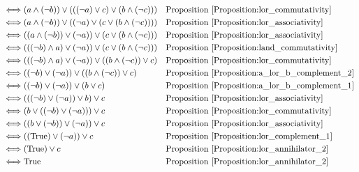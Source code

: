 \begin{prop}
\begin{align*}
\iff & (a \land (\lnot b)) \lor (((\lnot a) \lor c) \lor (b \land (\lnot c)))
& & \text{Proposition \ref{Proposition:lor_commutativity}} \\
\iff & (a \land (\lnot b)) \lor ((\lnot a) \lor (c \lor (b \land (\lnot c))))
& & \text{Proposition \ref{Proposition:lor_associativity}} \\
\iff & ((a \land (\lnot b)) \lor (\lnot a)) \lor (c \lor (b \land (\lnot c)))
& & \text{Proposition \ref{Proposition:lor_associativity}} \\
\iff & (((\lnot b) \land a) \lor (\lnot a)) \lor (c \lor (b \land (\lnot c)))
& & \text{Proposition \ref{Proposition:land_commutativity}} \\
\iff & (((\lnot b) \land a) \lor (\lnot a)) \lor ((b \land (\lnot c)) \lor c)
& & \text{Proposition \ref{Proposition:lor_commutativity}} \\
\iff & ((\lnot b) \lor (\lnot a)) \lor ((b \land (\lnot c)) \lor c)
& & \text{Proposition \ref{Proposition:a_lor_b_complement_2}} \\
\iff & ((\lnot b) \lor (\lnot a)) \lor (b \lor c)
& & \text{Proposition \ref{Proposition:a_lor_b_complement_1}} \\
\iff & (((\lnot b) \lor (\lnot a)) \lor b) \lor c
& & \text{Proposition \ref{Proposition:lor_associativity}} \\
\iff & (b \lor ((\lnot b) \lor (\lnot a))) \lor c
& & \text{Proposition \ref{Proposition:lor_commutativity}} \\
\iff & ((b \lor (\lnot b)) \lor (\lnot a)) \lor c
& & \text{Proposition \ref{Proposition:lor_associativity}} \\
\iff & ((\text{True}) \lor (\lnot a)) \lor c
& & \text{Proposition \ref{Proposition:lor_complement_1}} \\
\iff & (\text{True}) \lor c
& & \text{Proposition \ref{Proposition:lor_annihilator_2}} \\
\iff & \text{True}
& & \text{Proposition \ref{Proposition:lor_annihilator_2}} \\
\end{align*}
\end{prop}

